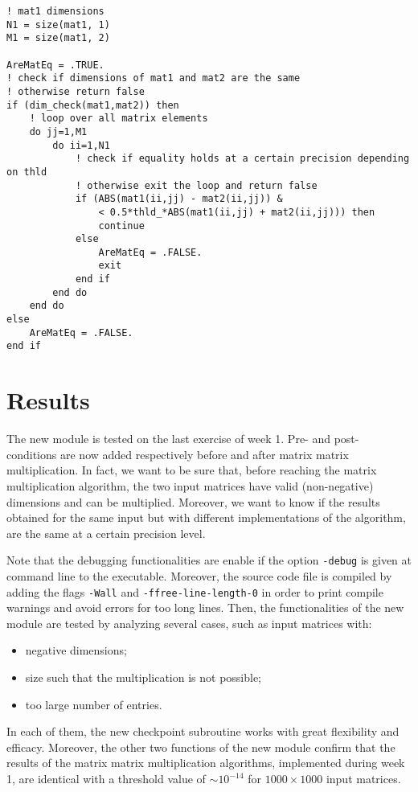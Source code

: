 \documentclass[pra, onecolumn, notitlepage, floats, 11pt]{revtex4-1}
\newcommand{\code}[2][black]{\color{#1}\texttt{#2}}
\newcommand{\codefunctionbold}[2]{\texttt{\bfseries {\color{cobalt}#1}({\color{lava}#2})}}
\begin{document}
\begin{lstlisting}[frame=single,label={lst:03_C_SS_3_1},caption={Sketch of implementation of \codefunctionbold{eq\_check}{mat1,mat2,thld} function for equality check between matrices.}]
! mat1 dimensions
N1 = size(mat1, 1)
M1 = size(mat1, 2)

AreMatEq = .TRUE.
! check if dimensions of mat1 and mat2 are the same
! otherwise return false
if (dim_check(mat1,mat2)) then
    ! loop over all matrix elements
    do jj=1,M1
        do ii=1,N1
            ! check if equality holds at a certain precision depending on thld
            ! otherwise exit the loop and return false
            if (ABS(mat1(ii,jj) - mat2(ii,jj)) &
                < 0.5*thld_*ABS(mat1(ii,jj) + mat2(ii,jj))) then
                continue
            else
                AreMatEq = .FALSE.
                exit
            end if
        end do
    end do
else
    AreMatEq = .FALSE.
end if
\end{lstlisting}





\section{Results}
The new module is tested on the last exercise of week 1. Pre- and post- conditions are now added respectively before and after matrix matrix multiplication. In fact, we want to be sure that, before reaching the matrix multiplication algorithm, the two input matrices have valid (non-negative) dimensions and can be multiplied. Moreover, we want to know if the results obtained for the same input but with different implementations of the algorithm, are the same at a certain precision level.

Note that the debugging functionalities are enable if the option \code{-debug} is given at command line to the executable. Moreover, the source code file is compiled by adding the flags \code{-Wall} and \code{-ffree-line-length-0} in order to print compile warnings and avoid errors for too long lines. Then, the functionalities of the new module are tested by analyzing several cases, such as input matrices with:
\begin{itemize}
    \item negative dimensions;
    \item size such that the multiplication is not possible;
    \item too large number of entries.
\end{itemize}
In each of them, the new checkpoint subroutine works with great flexibility and efficacy. Moreover, the other two functions of the new module confirm that the results of the matrix matrix multiplication algorithms, implemented during week 1, are identical with a threshold value of \( \sim 10^{-14} \) for \( 1000 \times 1000 \) input matrices.
\end{document}
